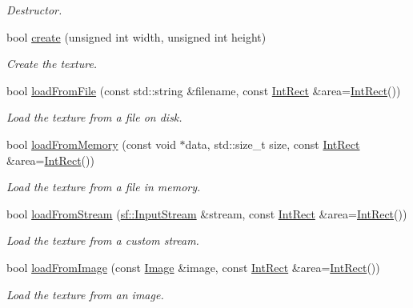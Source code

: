 \begin{DoxyCompactItemize}
\begin{DoxyCompactList}\small\item\em Destructor. \end{DoxyCompactList}\item 
bool \hyperlink{classsf_1_1_texture_a89b4c7d204acf1033c3a1b6e0a3ad0a3}{create} (unsigned int width, unsigned int height)
\begin{DoxyCompactList}\small\item\em Create the texture. \end{DoxyCompactList}\item 
bool \hyperlink{classsf_1_1_texture_a8e1b56eabfe33e2e0e1cb03712c7fcc7}{load\+From\+File} (const std\+::string \&filename, const \hyperlink{classsf_1_1_rect}{Int\+Rect} \&area=\hyperlink{classsf_1_1_rect}{Int\+Rect}())
\begin{DoxyCompactList}\small\item\em Load the texture from a file on disk. \end{DoxyCompactList}\item 
bool \hyperlink{classsf_1_1_texture_a2c4adb19dd4cbee0a588eeb85e52a249}{load\+From\+Memory} (const void $\ast$data, std\+::size\+\_\+t size, const \hyperlink{classsf_1_1_rect}{Int\+Rect} \&area=\hyperlink{classsf_1_1_rect}{Int\+Rect}())
\begin{DoxyCompactList}\small\item\em Load the texture from a file in memory. \end{DoxyCompactList}\item 
bool \hyperlink{classsf_1_1_texture_a6803a13465a7113a8964d1081841886d}{load\+From\+Stream} (\hyperlink{classsf_1_1_input_stream}{sf\+::\+Input\+Stream} \&stream, const \hyperlink{classsf_1_1_rect}{Int\+Rect} \&area=\hyperlink{classsf_1_1_rect}{Int\+Rect}())
\begin{DoxyCompactList}\small\item\em Load the texture from a custom stream. \end{DoxyCompactList}\item 
bool \hyperlink{classsf_1_1_texture_abec4567ad9856a3596dc74803f26fba2}{load\+From\+Image} (const \hyperlink{classsf_1_1_image}{Image} \&image, const \hyperlink{classsf_1_1_rect}{Int\+Rect} \&area=\hyperlink{classsf_1_1_rect}{Int\+Rect}())
\begin{DoxyCompactList}\small\item\em Load the texture from an image. \end{DoxyCompactList}\item 

\end{DoxyCompactItemize}

